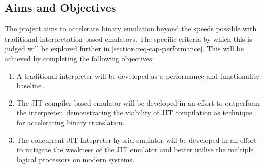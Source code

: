 \subsection{Aims and Objectives}

The project aims to accelerate binary emulation beyond the speeds possible with traditional interpretation based emulators. The specific criteria by which this is judged will be explored further in \autoref{section:req-cap-performance}. This will be achieved by completing the following objectives:

\begin{enumerate}
    \item A traditional interpreter will be developed as a performance and functionality baseline.
    
    \item The JIT compiler based emulator will be developed in an effort to outperform the interpreter, demonstrating the viability of JIT compilation as technique for accelerating binary translation.
    
    \item The concurrent JIT-Intepreter hybrid emulator will be developed in an effort to mitigate the weakness of the JIT emulator and better utilise the multiple logical processors on modern systems.
\end{enumerate}